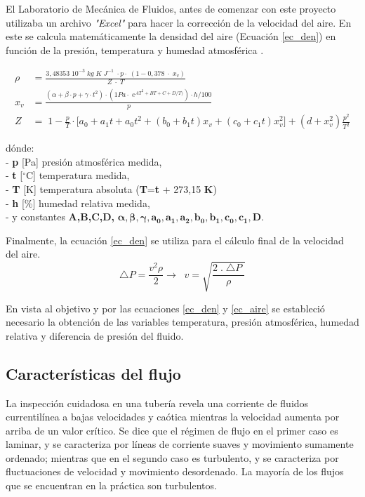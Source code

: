 
El Laboratorio de Mecánica de Fluidos, antes de comenzar con este proyecto utilizaba un archivo \textit{"{}Excel"} para hacer la corrección de la velocidad del aire. En este se calcula matemáticamente la densidad del aire (Ecuación \ref{ec_den}) en función de la presión, temperatura y humedad atmosférica \cite{airecalculo}.

\begin{align}
	\rho&=\frac{3,48353\;10^{-3}\;kg\;K\;J^{-1}\;\cdot p\cdot\;(1-0,378\;\cdot\;x_v)}{Z\;\cdot\;T} \label{ec_den}\\
	x_v&=\frac{(\alpha+\beta\cdot p+\gamma\cdot t^2)\cdot(1Pa\cdot\;e^{AT^2+BT+C+D/T)})\cdot h/100}p\\
	Z&=\;1-\frac pT\cdot\lbrack a_0+a_1t+a_0t^2+(b_0+b_1t)x_v+(c_0+c_1t)x_v^2\rbrack+(d+x_v^2)\frac{p^2}{T^2}
\end{align}

dónde:\\
- \textbf{p } [Pa] presión atmosférica medida,\\
- \textbf{t } [$^{\circ}$C] temperatura medida,\\
- \textbf{T } [K] temperatura absoluta (\textbf{T}=\textbf{t} + 273,15 \textbf{K})\\
- \textbf{h } [\%] humedad relativa medida,\\
- y constantes \textbf{A,B,C,D,} $\boldsymbol{\alpha , \beta  , \gamma , a_0, a_1 ,a_2 ,b_0  ,b_1 , c_0 , c_1, D. }$


Finalmente, la ecuación  \ref{ec_den} se utiliza para el cálculo final de la velocidad del aire.
\begin{equation}
	\triangle P=\frac{v^2\rho}2\rightarrow\;\;v=\sqrt{\frac{2\;.\;\triangle P\;}\rho}
	\label{ec_aire}
\end{equation}

En vista al objetivo y por las ecuaciones \ref{ec_den} y \ref{ec_aire} se estableció necesario la obtención de las variables temperatura, presión atmosférica, humedad relativa y diferencia de presión del fluido. 

\subsection{Características del flujo}
La inspección cuidadosa en una tubería revela una corriente de fluidos currentilínea a bajas velocidades y caótica mientras la velocidad aumenta por arriba de un valor crítico. Se dice que el régimen de flujo en el primer caso es laminar, y se caracteriza por líneas de corriente suaves y movimiento sumamente
ordenado; mientras que en el segundo caso es turbulento, y se caracteriza por
fluctuaciones de velocidad y movimiento  desordenado. La mayoría de los flujos que se encuentran en la
práctica son turbulentos. 

